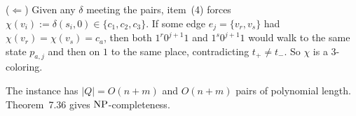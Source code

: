 \begin{soln}
($\Leftarrow$) Given any $\delta$ meeting the pairs, item~(4) forces $\chi(v_i):=\delta(s_i,0)\in\{c_1,c_2,c_3\}$. If some edge $e_j=\{v_r,v_s\}$ had $\chi(v_r)=\chi(v_s)=c_a$, then both $1^r 0^{j+1}1$ and $1^s 0^{j+1}1$ would walk to the same state $p_{a,j}$ and then on $1$ to the same place, contradicting $t_+\neq t_-$. So $\chi$ is a $3$-coloring.

The instance has $|Q|=O(n+m)$ and $O(n+m)$ pairs of polynomial length. Theorem~7.36 gives $\mathrm{NP}$-completeness.
\end{soln}
